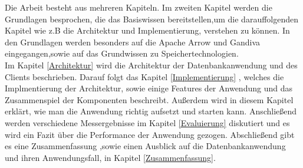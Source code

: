 Die Arbeit besteht aus mehreren Kapiteln. Im zweiten Kapitel werden die Grundlagen besprochen, die das Basiswissen bereitstellen,um die darauffolgenden Kapitel wie z.B die Architektur und Implementierung, verstehen zu können.
In den Grundlagen werden besonders auf die Apache Arrow und Gandiva eingegangen,sowie auf das Grundwissen zu Speichertechnologien.\\
Im Kapitel \ref{Architektur} wird die Architektur der Datenbankanwendung und des Clients beschrieben. Darauf folgt das Kapitel \ref{Implementierung} , welches die Implmentierung der Architektur, sowie einige Features der Anwendung und das Zusammenspiel der Komponenten beschreibt. Außerdem wird in diesem Kapitel erklärt, wie man die Anwendung richtig aufsetzt und starten kann.
Anschließend werden verschiedene Messergebnisse im Kapitel \ref{Evaluierung} diskutiert und es wird ein Fazit über die Performance der Anwendung gezogen.
Abschließend gibt es eine Zusammenfassung ,sowie einen Ausblick auf die Datenbankanwendung und ihren Anwendungsfall, in Kapitel \ref{Zusammenfassung}. 
  